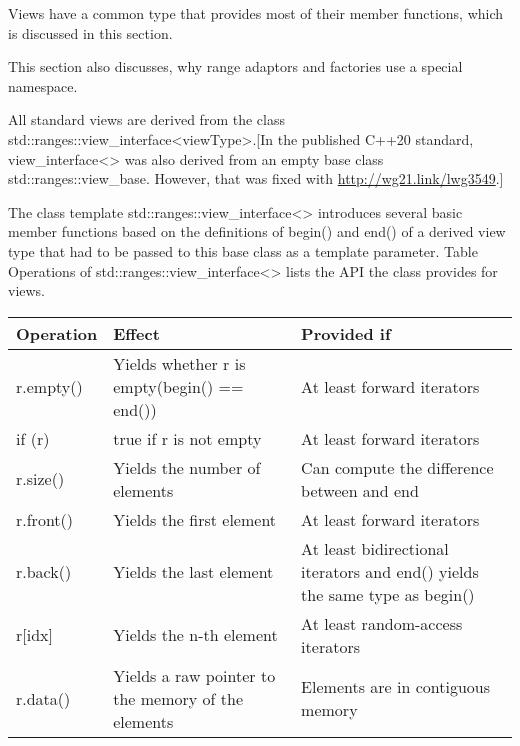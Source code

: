 
Views have a common type that provides most of their member functions, which is discussed in this section.

This section also discusses, why range adaptors and factories use a special namespace.


All standard views are derived from the class std::ranges::view\_interface<viewType>.[In the published C++20 standard, view\_interface<> was also derived from an empty base class std::ranges::view\_base. However, that was fixed with \url{http://wg21.link/lwg3549}.]

The class template std::ranges::view\_interface<> introduces several basic member functions based on the definitions of begin() and end() of a derived view type that had to be passed to this base class as a template parameter. Table Operations of std::ranges::view\_interface<> lists the API the class provides for views.

\begin{table}[H]
\centering
\begin{tabular}{|l|l|l|}
	\hline
	\textbf{Operation} & \textbf{Effect}                             & \textbf{Provided if}                       \\ \hline
	r.empty()          & Yields whether r is empty(begin() == end()) & At least forward iterators                 \\ \hline
	if (r)             & true if r is not empty                      & At least forward iterators                 \\ \hline
	r.size()           & Yields the number of elements               & Can compute the difference between and end \\ \hline
	r.front()          & Yields the first element                    & At least forward iterators                 \\ \hline
	r.back() & Yields the last element                            & At least bidirectional iterators and end() yields the same type as begin() \\ \hline
	r{[}idx{]}         & Yields the n-th element                     & At least random-access iterators           \\ \hline
	r.data() & Yields a raw pointer to the memory of the elements & Elements are in contiguous memory                                          \\ \hline
\end{tabular}
\end{table}


